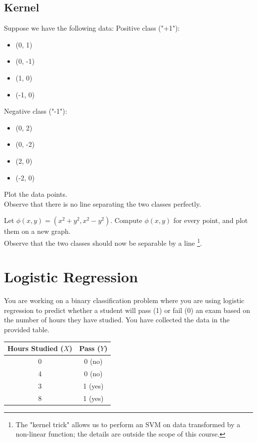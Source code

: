 \documentclass[]{article}
\begin{document}
	
	
	\subsection{Kernel}
	Suppose we have the following data:
	Positive class ("+1"):
	\begin{itemize}
		\item (0, 1)
		\item (0, -1)
		\item (1, 0)
		\item (-1, 0)
	\end{itemize}
	Negative class ("-1"):
	\begin{itemize}
		\item (0, 2)
		\item (0, -2)
		\item (2, 0)
		\item (-2, 0)
	\end{itemize}
	Plot the data points.\\
	Observe that there is no line separating the two classes perfectly.
	
	\vspace{0.5cm}
	
	Let $\phi(x,y) = (x^2 + y^2, x^2-y^2)$.
	Compute $\phi(x,y)$ for every point, and plot them on a new graph.\\
	Observe that the two classes should now be separable by a line
	\footnote{
		The "kernel trick" allows us to perform an SVM on data transformed by a non-linear function; the details are outside the scope of this course.
	}.
	
	
	
	
	\section{Logistic Regression}
	You are working on a binary classification problem where you are using logistic regression to predict whether a student will pass (1) or fail (0) an exam based on the number of hours they have studied. You have collected the data in the provided table.
	
	\begin{table}[h!]
		\centering
		\begin{tabular}{|c|c|}
			\hline
			Hours Studied ($X$) & Pass ($Y$) \\
			\hline
			0 & 0 (no) \\
			4 & 0 (no) \\
			3 & 1 (yes) \\
			8 & 1 (yes) \\
			\hline
		\end{tabular}
	\end{table}
	
\end{document}
